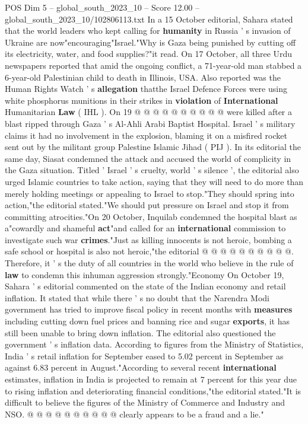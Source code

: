 \begin{textsample}{POS Dim 5 – global\_south\_2023\_10 – Score 12.00 – global\_south\_2023\_10/102806113.txt}
In a 15 October editorial, Sahara stated that the world leaders who kept calling for \textbf{humanity} in Russia ' s invasion of Ukraine are now"encouraging"Israel."Why is Gaza being punished by cutting off its electricity, water, and food supplies?"it read.
On 17 October, all three Urdu newspapers reported that amid the ongoing conflict, a 71-year-old man stabbed a 6-year-old Palestinian child to death in Illinois, USA.
Also reported was the Human Rights Watch ' s \textbf{allegation} thatthe Israel Defence Forces were using white phosphorus munitions in their strikes in \textbf{violation} of \textbf{International} Humanitarian \textbf{Law} ( IHL ).
On 19 @ @ @ @ @ @ @ @ @ @ were killed after a blast ripped through Gaza ' s Al-Ahli Arabi Baptist Hospital.
Israel ' s military claims it had no involvement in the explosion, blaming it on a misfired rocket sent out by the militant group Palestine Islamic Jihad ( PIJ ).
In its editorial the same day, Siasat condemned the attack and accused the world of complicity in the Gaza situation.
Titled ' Israel ' s cruelty, world ' s silence ', the editorial also urged Islamic countries to take action, saying that they will need to do more than merely holding meetings or appealing to Israel to stop."They should spring into action,"the editorial stated."We should put pressure on Israel and stop it from committing atrocities."On 20 October, Inquilab condemned the hospital blast as a"cowardly and shameful \textbf{act}"and called for an \textbf{international} commission to investigate such war \textbf{crimes}."Just as killing innocents is not heroic, bombing a safe school or hospital is also not heroic,"the editorial @ @ @ @ @ @ @ @ @ @.
Therefore, it ' s the duty of all countries in the world who believe in the rule of \textbf{law} to condemn this inhuman aggression strongly."Economy On October 19, Sahara ' s editorial commented on the state of the Indian economy and retail inflation.
It stated that while there ' s no doubt that the Narendra Modi government has tried to improve fiscal policy in recent months with \textbf{measures} including cutting down fuel prices and banning rice and sugar \textbf{exports}, it has still been unable to bring down inflation.
The editorial also questioned the government ' s inflation data.
According to figures from the Ministry of Statistics, India ' s retail inflation for September eased to 5.02 percent in September as against 6.83 percent in August."According to several recent \textbf{international} estimates, inflation in India is projected to remain at 7 percent for this year due to rising inflation and deteriorating financial conditions,"the editorial stated."It is difficult to believe the figures of the Ministry of Commerce and Industry and NSO. @ @ @ @ @ @ @ @ @ @ clearly appears to be a fraud and a lie."

\end{textsample}
